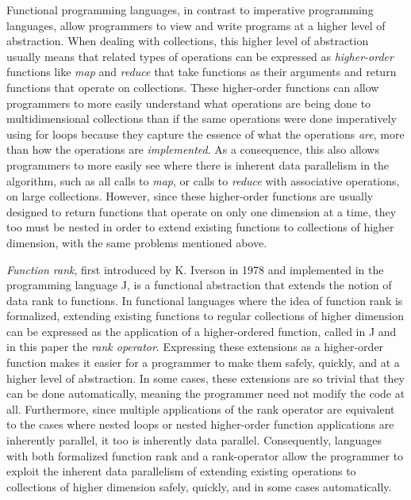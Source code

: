 Functional programming languages, in contrast to imperative programming languages, 
allow programmers to view and write programs at a higher level of abstraction. %
When dealing with collections, this higher level of abstraction usually means that related types of operations can be expressed as \textit{higher-order} functions 
like \textit{map} and \textit{reduce} that take functions as their arguments and return functions that operate on collections.
These higher-order functions can allow programmers to more easily understand what operations are being done to multidimensional collections 
than if the same operations were done imperatively using for loops 
because they capture the essence of what the operations \textit{are}, %
more than how the operations are \textit{implemented}.
As a consequence, this %
also allows programmers to more easily see %
where there is inherent data parallelism in the algorithm, such as all calls to \textit{map}, or calls to \textit{reduce} with associative operations, on large collections.
However, since these higher-order functions are usually designed to return functions that operate on only one dimension at a time, 
they too must be nested in order to extend existing functions to collections of higher dimension, with the same problems mentioned above. %

\textit{Function rank}, first introduced by K. Iverson in 1978\cite{opandfunc} %
and implemented in the programming language J, 
is a functional abstraction that extends the notion of data rank to functions. 
In functional languages where the idea of function rank is formalized, 
extending existing functions to regular collections of higher dimension 
can be expressed as the application of a higher-ordered function, 
called in J and in this paper the \textit{rank operator}. \cite{jvocab} %
Expressing these extensions as a higher-order function 
makes it easier for a programmer to make them %
safely, %
quickly, and at a higher level of abstraction.
In some cases, these extensions are so trivial that they can be done automatically,\cite{jvocab} \cite{rankanduni} 
meaning the programmer need not modify the code at all. 
Furthermore, since multiple applications of the rank operator 
are equivalent to the cases where nested loops or nested higher-order function applications are inherently parallel, 
it too is inherently data parallel.
Consequently, languages with both formalized function rank and a rank-operator allow the programmer to 
exploit the inherent data parallelism of extending existing operations to collections of higher dimension 
safely, quickly, and in some cases automatically.

